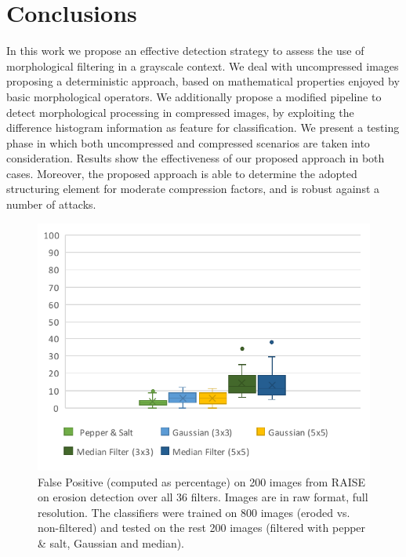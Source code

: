 \documentclass{ieeeaccess}
\begin{document}
\section{Conclusions}
\label{sec:conclusions}
In this work we propose an effective detection strategy to assess the use of morphological filtering in a grayscale context. We deal with uncompressed images proposing a deterministic approach, based on mathematical properties enjoyed by basic morphological operators. We additionally propose a modified pipeline to detect morphological processing in compressed images, by exploiting the difference histogram information as feature for  classification. We present a testing phase in which both uncompressed and compressed scenarios are taken into consideration. Results show the effectiveness of our proposed approach in both cases. Moreover, the proposed approach is able to determine the adopted structuring element for moderate compression factors, and is robust against a number of attacks.

\begin{figure}[t!]
	\centering
	\includegraphics[width=\linewidth]{different_filters.pdf}
	\caption{False Positive (computed as percentage) on 200 images from RAISE on erosion detection over all 36 filters. Images are in raw format, full resolution. The classifiers were trained on 800 images (eroded vs. non-filtered) and tested on the rest 200 images (filtered with pepper \& salt, Gaussian and median).}
	\label{fig:different_filters}
\end{figure}



\end{document}

